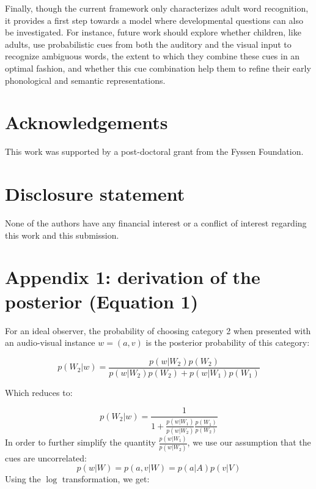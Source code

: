\documentclass[english,,man,floatsintext]{apa6}
\theoremstyle{definition}
\theoremstyle{definition}
\theoremstyle{definition}
\theoremstyle{remark}
\begin{document}
Finally, though the current framework only characterizes adult word
recognition, it provides a first step towards a model where
developmental questions can also be investigated. For instance, future
work should explore whether children, like adults, use probabilistic
cues from both the auditory and the visual input to recognize ambiguous
words, the extent to which they combine these cues in an optimal
fashion, and whether this cue combination help them to refine their
early phonological and semantic representations.

\vspace{1em}

\vspace{1em}

\section{Acknowledgements}\label{acknowledgements}

This work was supported by a post-doctoral grant from the Fyssen
Foundation.

\section{Disclosure statement}\label{disclosure-statement}

None of the authors have any financial interest or a conflict of
interest regarding this work and this submission.

\section{Appendix 1: derivation of the posterior (Equation
1)}\label{appendix-1-derivation-of-the-posterior-equation-1}

For an ideal observer, the probability of choosing category 2 when
presented with an audio-visual instance \(w = (a, v)\) is the posterior
probability of this category:

\[p(W_2 | w)=\frac{p(w|W_2)p(W_2)}{p(w|W_2)p(W_2)+p(w|W_1)p(W_1)}\]

Which reduces to:

\[p(W_2 | w)=\frac{1}{1+\frac{p(w|W_1)}{p(w|W_2)} \frac{p(W_1)}{p(W_2)}}\]
In order to further simplify the quantity \(\frac{p(w|W_1)}{p(w|W_2)}\),
we use our assumption that the cues are uncorrelated:
\[p(w | W) = p(a,v| W) = p(a| A)p(v| V)\] Using the \(\log\)
transformation, we get:
\end{document}
